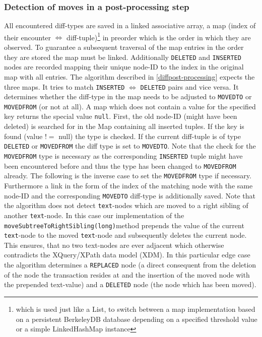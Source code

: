\subsubsection{Detection of moves in a post-processing step} All encountered diff-types are saved in a linked associative array, a map (index of their encounter $\Leftrightarrow$ diff-tuple)\footnote{which is used just like a List, to switch between a map implementation based on a persistent BerkeleyDB database depending on a specified threshold value or a simple LinkedHashMap instance} in preorder which is the order in which they are observed. To guarantee a subsequent traversal of the map entries in the order they are stored the map must be linked. Additionally \texttt{DELETED} and \texttt{INSERTED} nodes are recorded mapping their unique node-ID to the index in the original map with all entries. The algorithm described in \ref{diffpost-processing} expects the three maps. It tries to match \texttt{INSERTED} $\Leftrightarrow$ \texttt{DELETED} pairs and vice versa. It determines whether the diff-type in the map needs to be adjusted to \texttt{MOVEDTO} or \texttt{MOVEDFROM} (or not at all). A map which does not contain a value for the specified key returns the special value \texttt{null}. First, the old node-ID (might have been deleted) is searched for in the Map containing all inserted tuples. If the key is found (value $!=$ null) the type is checked. If the current diff-tuple is of type \texttt{DELETED} or \texttt{MOVEDFROM} the diff type is set to \texttt{MOVEDTO}. Note that the check for the \texttt{MOVEDFROM} type is necessary as the corresponding \texttt{INSERTED} tuple might have been encountered before and thus the type has been changed to \texttt{MOVEDFROM} already. The following is the inverse case to set the \texttt{MOVEDFROM} type if necessary. Furthermore a link in the form of the index of the matching node with the same node-ID and the corresponding \texttt{MOVEDTO} diff-type is additionally saved. Note that the algorithm does not detect \texttt{text}-nodes which are moved to a right sibling of another \texttt{text}-node. In this case our implementation of the \texttt{moveSubtreeToRightSibling(long)}\-method prepends the value of the current \texttt{text}-node to the moved \texttt{text}-node and subsequently deletes the current node. This ensures, that no two text-nodes are ever adjacent which otherwise contradicts the XQuery/XPath data model (XDM). In this particular edge case the algorithm determines a \texttt{REPLACED} node (a direct consequent from the deletion of the node the transaction resides at and the insertion of the moved node with the prepended text-value) and a \texttt{DELETED} node (the node which has been moved).

